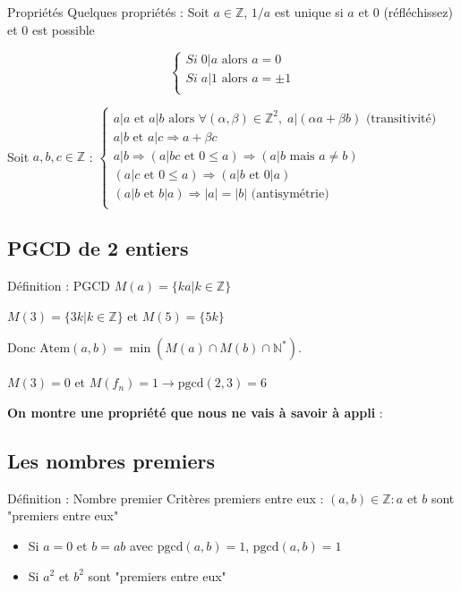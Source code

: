 \documentclass[a4paper,11pt]{article}
\begin{document}
\begin{propbox}{Propriétés}
Quelques propriétés : Soit $a \in \mathbb{Z}$, $1/a$ est unique si $a$ et 0 (réfléchissez) et $0$ est possible

\[
\begin{cases}
Si \; 0 | a \text{ alors } a = 0 \\
Si \; a | 1 \text{ alors } a = \pm 1 \\
\end{cases}
\]

Soit $a, b, c \in \mathbb{Z}$ : $\begin{cases} 
a | a \text{ et } a | b \text{ alors } \forall (\alpha, \beta) \in \mathbb{Z}^2, \; a | (\alpha a + \beta b) \text{ (transitivité)} \\
a | b \text{ et } a | c \Rightarrow a + \beta c \\
a | b \Rightarrow (a | bc \text{ et } 0 \leq a) \Rightarrow (a | b \text{ mais } a \neq b) \\
(a | c \text{ et } 0 \leq a) \Rightarrow (a | b \text{ et } 0 | a) \\
(a | b \text{ et } b | a) \Rightarrow |a| = |b| \text{ (antisymétrie)} \\
\end{cases}$
\end{propbox}

\subsection{PGCD de 2 entiers}

\begin{defbox}{Définition : PGCD}
$M(a) = \{ka | k \in \mathbb{Z}\}$

$M(3) = \{3k | k \in \mathbb{Z}\}$ et $M(5) = \{5k\}$

Donc $\text{Atem}(a, b) = \min(M(a) \cap M(b) \cap \mathbb{N}^*)$.

$M(3) = 0$ et $M(f_n) = 1 \rightarrow \text{pgcd}(2, 3) = 6$

\textbf{On montre une propriété que nous ne vais à savoir à appli} :
\end{defbox}

\subsection{Les nombres premiers}

\begin{defbox}{Définition : Nombre premier}
Critères premiers entre eux : $(a, b) \in \mathbb{Z} : a$ et $b$ sont "premiers entre eux"

\begin{itemize}
    \item Si $a = 0$ et $b = ab$ avec $\text{pgcd}(a, b) = 1$, $\text{pgcd}(a, b) = 1$
    \item Si $a^2$ et $b^2$ sont "premiers entre eux"
\end{itemize}
\end{defbox}
\end{document}

